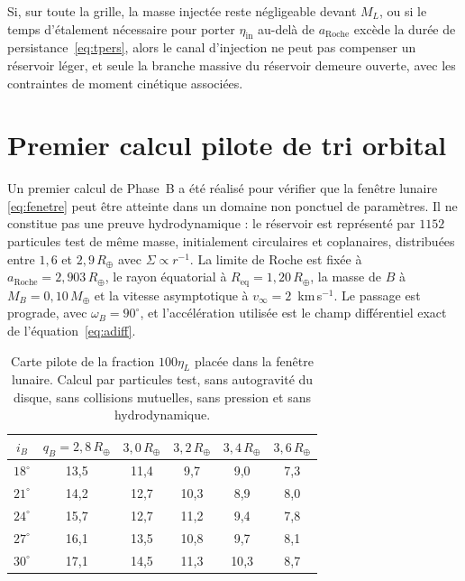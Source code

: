\documentclass[11pt,a4paper,openany]{report}
\newcommand{\Mt}{M_{\oplus}}
\newcommand{\Rt}{R_{\oplus}}
\newcommand{\Req}{R_{\mathrm{eq}}}
\newcommand{\aR}{a_{\mathrm{Roche}}}
\begin{document}
\begin{falsif}
Si, sur toute la grille, la masse injectée reste négligeable devant $M_L$, ou si le temps
d'étalement nécessaire pour porter $\eta_{\mathrm{in}}$ au-delà de $\aR$ excède la durée de
persistance~\eqref{eq:tpers}, alors le canal d'injection ne peut pas compenser un réservoir léger,
et seule la branche massive du réservoir demeure ouverte, avec les contraintes de moment cinétique
associées.
\end{falsif}

\section{Premier calcul pilote de tri orbital}
\label{sec:pilote-etaL}

Un premier calcul de Phase~B a été réalisé pour vérifier que la fenêtre lunaire
\eqref{eq:fenetre} peut être atteinte dans un domaine non ponctuel de paramètres. Il ne constitue
pas une preuve hydrodynamique : le réservoir est représenté par $1152$ particules test de même
masse, initialement circulaires et coplanaires, distribuées entre $1{,}6$ et $2{,}9\,\Rt$ avec
$\Sigma\propto r^{-1}$. La limite de Roche est fixée à $a_{\mathrm{Roche}}=2{,}903\,\Rt$, le rayon
équatorial à $\Req=1{,}20\,\Rt$, la masse de $B$ à $M_B=0{,}10\,\Mt$ et la vitesse asymptotique à
$v_\infty=2$~km\,s$^{-1}$. Le passage est prograde, avec $\omega_B=90^\circ$, et l'accélération
utilisée est le champ différentiel exact de l'équation~\eqref{eq:adiff}.

\begin{table}[htbp]
\centering
\small
\caption{Carte pilote de la fraction $100\eta_L$ placée dans la fenêtre lunaire. Calcul par
particules test, sans autogravité du disque, sans collisions mutuelles, sans pression et sans
hydrodynamique.}
\label{tab:pilote-etaL}
\begin{tabular}{c|ccccc}
\toprule
$i_B$ & $q_B=2{,}8\,\Rt$ & $3{,}0\,\Rt$ & $3{,}2\,\Rt$ & $3{,}4\,\Rt$ & $3{,}6\,\Rt$ \\
\midrule
$18^\circ$ & 13{,}5 & 11{,}4 & 9{,}7 & 9{,}0 & 7{,}3 \\
$21^\circ$ & 14{,}2 & 12{,}7 & 10{,}3 & 8{,}9 & 8{,}0 \\
$24^\circ$ & 15{,}7 & 12{,}7 & 11{,}2 & 9{,}4 & 7{,}8 \\
$27^\circ$ & 16{,}1 & 13{,}5 & 10{,}8 & 9{,}7 & 8{,}1 \\
$30^\circ$ & 17{,}1 & 14{,}5 & 11{,}3 & 10{,}3 & 8{,}7 \\
\bottomrule
\end{tabular}
\end{table}
\end{document}

